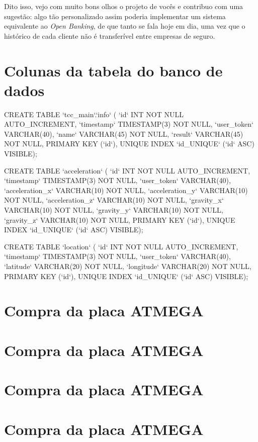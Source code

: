 Dito isso, vejo com muito bons olhos o projeto de vocês e contribuo com uma sugestão: algo tão personalizado assim poderia implementar um sistema equivalente ao \textit{Open Banking}, de que tanto se fala hoje em dia, uma vez que o histórico de cada cliente não é transferível entre empresas de seguro.



\section{Colunas da tabela do banco de dados}

CREATE TABLE `tcc_main`.`info` (
  `id` INT NOT NULL AUTO_INCREMENT, 
  `timestamp` TIMESTAMP(3) NOT NULL,
  `user_token` VARCHAR(40),
  `name` VARCHAR(45) NOT NULL,
  `result` VARCHAR(45) NOT NULL,
  PRIMARY KEY (`id`),
  UNIQUE INDEX `id_UNIQUE` (`id` ASC) VISIBLE);

CREATE TABLE `acceleration` (
  `id` INT NOT NULL AUTO_INCREMENT,
  `timestamp` TIMESTAMP(3) NOT NULL,
  `user_token` VARCHAR(40),
  `acceleration_x` VARCHAR(10) NOT NULL,
  `acceleration_y` VARCHAR(10) NOT NULL,
  `acceleration_z` VARCHAR(10) NOT NULL,
  `gravity_x` VARCHAR(10) NOT NULL,
  `gravity_y` VARCHAR(10) NOT NULL,
  `gravity_z` VARCHAR(10) NOT NULL,
  PRIMARY KEY (`id`),
  UNIQUE INDEX `id_UNIQUE` (`id` ASC) VISIBLE);

CREATE TABLE `location` (
  `id` INT NOT NULL AUTO_INCREMENT,
  `timestamp` TIMESTAMP(3) NOT NULL,
  `user_token` VARCHAR(40),
  `latitude` VARCHAR(20) NOT NULL,
  `longitude` VARCHAR(20) NOT NULL,
  PRIMARY KEY (`id`),
  UNIQUE INDEX `id_UNIQUE` (`id` ASC) VISIBLE);

\section{Compra da placa ATMEGA}
\section{Compra da placa ATMEGA}
\section{Compra da placa ATMEGA}
\section{Compra da placa ATMEGA}


